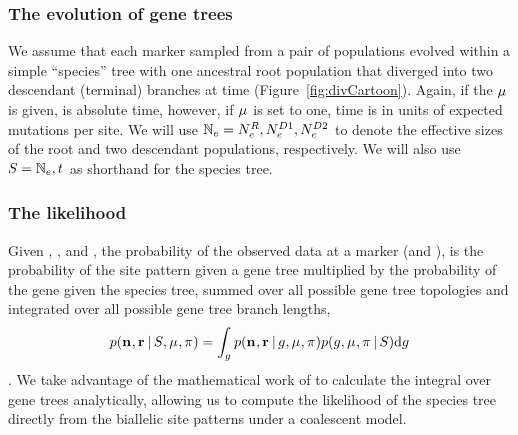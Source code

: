\subsubsection{The evolution of gene trees}

We assume that each marker sampled from a pair of populations evolved within a
simple ``species'' tree with one ancestral root population that diverged into
two descendant (terminal) branches at time \comparisondivtime
(Figure~\ref{fig:divCartoon}).
Again, if the $\murate$ is given, \comparisondivtime is absolute time, however,
if $\murate$ is set to one, time is in units of expected mutations per site.
We will use
$\comparisonpopsizes = \epopsize[\rootpopindex],
\epopsize[\descendantpopindex{1}], \epopsize[\descendantpopindex{2}]$
to denote
the effective sizes of the root and two descendant populations, respectively.
We will also use $\sptree = \comparisonpopsizes, \comparisondivtime$ as
shorthand for the species tree.

\subsubsection{The likelihood}

\begin{linenomath}
Given \murate, \gfreq, \comparisondivtime and \comparisonpopsizes, the
probability of the observed data at a marker (\allelecount and \redallelecount),
is the probability of the site pattern given a gene tree multiplied by the
probability of the gene given the species tree, summed over all possible gene
tree topologies and integrated over all possible gene tree branch lengths,
\begin{equation}
    \pr(\leafallelecounts, \leafredallelecounts \given \sptree, \murate, \gfreq)
    =
    \int_{\genetree}
    \pr(\leafallelecounts, \leafredallelecounts \given \genetree, \murate, \gfreq)
    \pr(\genetree, \murate, \gfreq \given \sptree)
    \diff{\genetree}
    \label{eq:markerlikelihood}
\end{equation}
\citep{Felsenstein1988,Nielsen2001,Rannala2003}.
We take advantage of the mathematical work of \citep{Bryant2012} to calculate
the integral over gene trees analytically, allowing us to compute the
likelihood of the species tree directly from the biallelic site patterns under
a coalescent model.
\end{linenomath}

